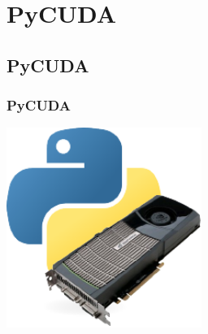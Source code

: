 \documentclass[a4paper,9pt]{beamer}
\begin{document}
\section{PyCUDA}
\subsection{PyCUDA}

\begin{frame}[fragile]
\frametitle{PyCUDA}
\begin{center}
\includegraphics[width=2.5in]{pics/pycuda-logo-crop.pdf}
\end{center}
\end{frame}
\end{document}
